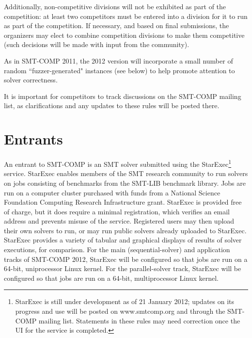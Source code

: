 \documentclass[12pt]{article}
\begin{document}
Additionally, non-competitive divisions will not be exhibited as
part of the competition: at least two competitors must be entered
into a division for it to run as part of the competition.
If necessary, and based on final submissions, the organizers may elect to
combine competition divisions to make them competitive (such decisions will
be made with input from the community).

As in SMT-COMP 2011, the 2012 version will incorporate a small number of
random ``fuzzer-generated" instances (see below) to help promote
attention to solver correctness.

It is important for competitors to track discussions on the SMT-COMP mailing
list, as clarifications and any updates to these rules will be posted there.

\section{Entrants}
\label{sec:entrants}

An entrant to SMT-COMP is an SMT solver
submitted using the StarExec\footnote{StarExec is still under development as of 21 January 2012;
updates on its progress and use will be posted on www.smtcomp.org and through
the SMT-COMP mailing list. Statements in these rules may need correction once the UI for the service is completed.} service.  
StarExec enables members of the
SMT research community to run solvers on jobs consisting of benchmarks
from the SMT-LIB benchmark library.  Jobs are run on a computer
cluster purchased with funds from a National Science Foundation
Computing Research Infrastructure grant.  StarExec is provided free of
charge, but it does require a minimal registration, which verifies an
email address and prevents misuse of the service.  Registered users
may then upload their own solvers to run, or may run public solvers
already uploaded to StarExec.  StarExec provides a variety of tabular
and graphical displays of results of solver executions, for
comparison. For the main (sequential-solver)
and application tracks 
of SMT-COMP 2012, StarExec will be configured so that jobs are run on a 64-bit,
uniprocessor Linux kernel.  For the parallel-solver track, StarExec
will be configured so that jobs are run on a 64-bit, multiprocessor
Linux kernel.
\end{document}

